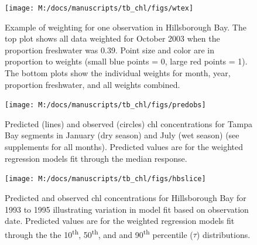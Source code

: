 \documentclass{svjour3}\usepackage[]{graphicx}\usepackage[]{color}
\begin{document}
\begin{figure}[!ht]


{\centering \texttt{[image: M:/docs/manuscripts/tb\_chl/figs/wtex]} 

}

\caption[Example of weighting for one observation in Hillsborough Bay]{Example of weighting for one observation in Hillsborough Bay.  The top plot shows all data weighted for October 2003 when the proportion freshwater was 0.39.  Point size and color are in proportion to weights (small blue points = 0, large red points = 1).  The bottom plots show the individual weights for month, year, proportion freshwater, and all weights combined.\label{fig:wtex}}
\end{figure}



\begin{figure}[!ht]


{\centering \texttt{[image: M:/docs/manuscripts/tb\_chl/figs/predobs]} 

}

\caption[Predicted (lines) and observed (circles) \ac{chl} concentrations for Tampa Bay segments in January (dry season) and July (wet season) (see supplements for all months)]{Predicted (lines) and observed (circles) \ac{chl} concentrations for Tampa Bay segments in January (dry season) and July (wet season) (see supplements for all months).  Predicted values are for the weighted regression models fit through the median response.\label{fig:predobs}}
\end{figure}



\begin{figure}[!ht]


{\centering \texttt{[image: M:/docs/manuscripts/tb\_chl/figs/hbslice]} 

}

\caption[Predicted and observed \ac{chl} concentrations for Hillsborough Bay for 1993 to 1995 illustrating variation in model fit based on observation date]{Predicted and observed \ac{chl} concentrations for Hillsborough Bay for 1993 to 1995 illustrating variation in model fit based on observation date. Predicted values are for the weighted regression models fit through the the 10\textsuperscript{th}, 50\textsuperscript{th}, and and 90\textsuperscript{th} percentile ($\tau$) distributions.\label{fig:hbslice}}
\end{figure}
\end{document}
